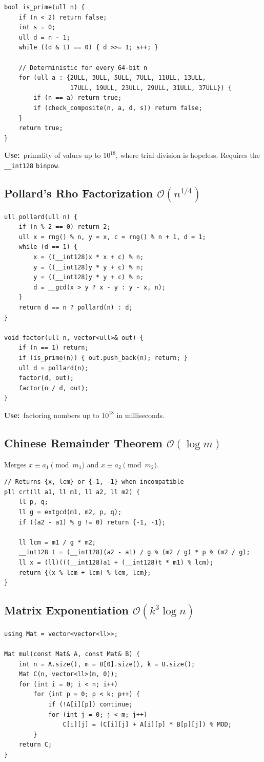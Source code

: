 \documentclass[10pt]{article}
\newcommand{\code}[1]{\texttt{\small #1}}
\newcommand{\sub}[2]{\subsection[#1]{#1\hspace{0.6em}%
  \textnormal{\color{accent2}\small$\mathcal{O}(#2)$}}}
\newcommand{\uses}[1]{{\color{accent2}\footnotesize\textbf{Use:}}~{\footnotesize #1}\par}
\begin{document}
\begin{multicols}{2}
\begin{lstlisting}
bool is_prime(ull n) {
    if (n < 2) return false;
    int s = 0;
    ull d = n - 1;
    while ((d & 1) == 0) { d >>= 1; s++; }

    // Deterministic for every 64-bit n
    for (ull a : {2ULL, 3ULL, 5ULL, 7ULL, 11ULL, 13ULL,
                  17ULL, 19ULL, 23ULL, 29ULL, 31ULL, 37ULL}) {
        if (n == a) return true;
        if (check_composite(n, a, d, s)) return false;
    }
    return true;
}
\end{lstlisting}
\uses{primality of values up to $10^{18}$, where trial division is
hopeless. Requires the \code{\_\_int128} \code{binpow}.}

\sub{Pollard's Rho Factorization}{n^{1/4}}
\begin{lstlisting}
ull pollard(ull n) {
    if (n % 2 == 0) return 2;
    ull x = rng() % n, y = x, c = rng() % n + 1, d = 1;
    while (d == 1) {
        x = ((__int128)x * x + c) % n;
        y = ((__int128)y * y + c) % n;
        y = ((__int128)y * y + c) % n;
        d = __gcd(x > y ? x - y : y - x, n);
    }
    return d == n ? pollard(n) : d;
}

void factor(ull n, vector<ull>& out) {
    if (n == 1) return;
    if (is_prime(n)) { out.push_back(n); return; }
    ull d = pollard(n);
    factor(d, out);
    factor(n / d, out);
}
\end{lstlisting}
\uses{factoring numbers up to $10^{18}$ in milliseconds.}

\sub{Chinese Remainder Theorem}{\log m}
Merges $x \equiv a_1 \pmod{m_1}$ and $x \equiv a_2 \pmod{m_2}$.
\begin{lstlisting}
// Returns {x, lcm} or {-1, -1} when incompatible
pll crt(ll a1, ll m1, ll a2, ll m2) {
    ll p, q;
    ll g = extgcd(m1, m2, p, q);
    if ((a2 - a1) % g != 0) return {-1, -1};

    ll lcm = m1 / g * m2;
    __int128 t = (__int128)(a2 - a1) / g % (m2 / g) * p % (m2 / g);
    ll x = (ll)(((__int128)a1 + (__int128)t * m1) % lcm);
    return {(x % lcm + lcm) % lcm, lcm};
}
\end{lstlisting}

\sub{Matrix Exponentiation}{k^3 \log n}
\begin{lstlisting}
using Mat = vector<vector<ll>>;

Mat mul(const Mat& A, const Mat& B) {
    int n = A.size(), m = B[0].size(), k = B.size();
    Mat C(n, vector<ll>(m, 0));
    for (int i = 0; i < n; i++)
        for (int p = 0; p < k; p++) {
            if (!A[i][p]) continue;
            for (int j = 0; j < m; j++)
                C[i][j] = (C[i][j] + A[i][p] * B[p][j]) % MOD;
        }
    return C;
}


\end{lstlisting}
\end{multicols}
\end{document}
